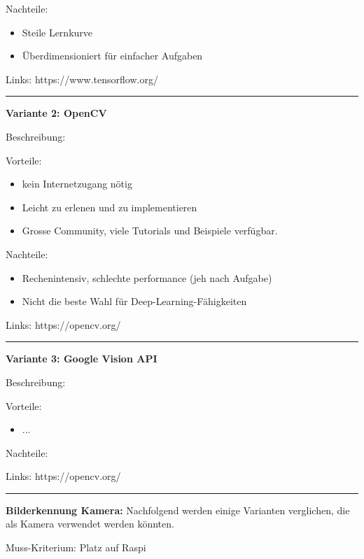 Nachteile:
\begin{itemize}
    \item Steile Lernkurve
    \item Überdimensioniert für einfacher Aufgaben
\end{itemize}

Links: https://www.tensorflow.org/

\vspace{5pt}
\hrule

\textbf{Variante 2: OpenCV}

Beschreibung:

Vorteile:
\begin{itemize}
    \item kein Internetzugang nötig
    \item Leicht zu erlenen und zu implementieren
    \item Grosse Community, viele Tutorials und Beispiele verfügbar.
\end{itemize}

Nachteile:
\begin{itemize}
    \item Rechenintensiv, schlechte performance (jeh nach Aufgabe)
    \item Nicht die beste Wahl für Deep-Learning-Fähigkeiten
\end{itemize}
Links: https://opencv.org/

\vspace{5pt}
\hrule

\textbf{Variante 3: Google Vision API}

Beschreibung:

Vorteile:
\begin{itemize}
    \item ...
\end{itemize}

Nachteile:

Links: https://opencv.org/

\vspace{5pt}
\hrule
\vspace{10pt}

\textbf{Bilderkennung Kamera:} Nachfolgend werden einige Varianten verglichen, die als Kamera verwendet werden könnten.

Muss-Kriterium: Platz auf Raspi